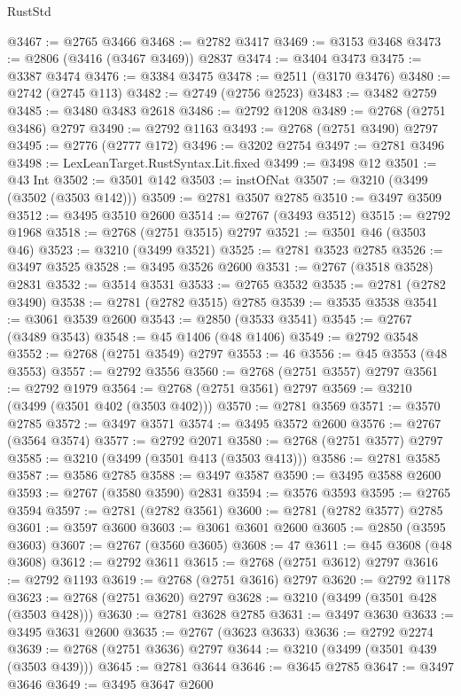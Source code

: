 \begin{lexlean}{RustStd}
\begin{coremodule}
@3467 := @2765 @3466
@3468 := @2782 @3417
@3469 := @3153 @3468
@3473 := @2806 (@3416 (@3467 @3469)) @2837
@3474 := @3404 @3473
@3475 := @3387 @3474
@3476 := @3384 @3475
@3478 := @2511 (@3170 @3476)
@3480 := @2742 (@2745 @113)
@3482 := @2749 (@2756 @2523)
@3483 := @3482 @2759
@3485 := @3480 @3483 @2618
@3486 := @2792 @1208
@3489 := @2768 (@2751 @3486) @2797
@3490 := @2792 @1163
@3493 := @2768 (@2751 @3490) @2797
@3495 := @2776 (@2777 @172)
@3496 := @3202 @2754
@3497 := @2781 @3496
@3498 := LexLeanTarget.RustSyntax.Lit.fixed
@3499 := @3498 @12
@3501 := @43 Int
@3502 := @3501 @142
@3503 := instOfNat
@3507 := @3210 (@3499 (@3502 (@3503 @142)))
@3509 := @2781 @3507 @2785
@3510 := @3497 @3509
@3512 := @3495 @3510 @2600
@3514 := @2767 (@3493 @3512)
@3515 := @2792 @1968
@3518 := @2768 (@2751 @3515) @2797
@3521 := @3501 @46 (@3503 @46)
@3523 := @3210 (@3499 @3521)
@3525 := @2781 @3523 @2785
@3526 := @3497 @3525
@3528 := @3495 @3526 @2600
@3531 := @2767 (@3518 @3528) @2831
@3532 := @3514 @3531
@3533 := @2765 @3532
@3535 := @2781 (@2782 @3490)
@3538 := @2781 (@2782 @3515) @2785
@3539 := @3535 @3538
@3541 := @3061 @3539 @2600
@3543 := @2850 (@3533 @3541)
@3545 := @2767 (@3489 @3543)
@3548 := @45 @1406 (@48 @1406)
@3549 := @2792 @3548
@3552 := @2768 (@2751 @3549) @2797
@3553 := 46
@3556 := @45 @3553 (@48 @3553)
@3557 := @2792 @3556
@3560 := @2768 (@2751 @3557) @2797
@3561 := @2792 @1979
@3564 := @2768 (@2751 @3561) @2797
@3569 := @3210 (@3499 (@3501 @402 (@3503 @402)))
@3570 := @2781 @3569
@3571 := @3570 @2785
@3572 := @3497 @3571
@3574 := @3495 @3572 @2600
@3576 := @2767 (@3564 @3574)
@3577 := @2792 @2071
@3580 := @2768 (@2751 @3577) @2797
@3585 := @3210 (@3499 (@3501 @413 (@3503 @413)))
@3586 := @2781 @3585
@3587 := @3586 @2785
@3588 := @3497 @3587
@3590 := @3495 @3588 @2600
@3593 := @2767 (@3580 @3590) @2831
@3594 := @3576 @3593
@3595 := @2765 @3594
@3597 := @2781 (@2782 @3561)
@3600 := @2781 (@2782 @3577) @2785
@3601 := @3597 @3600
@3603 := @3061 @3601 @2600
@3605 := @2850 (@3595 @3603)
@3607 := @2767 (@3560 @3605)
@3608 := 47
@3611 := @45 @3608 (@48 @3608)
@3612 := @2792 @3611
@3615 := @2768 (@2751 @3612) @2797
@3616 := @2792 @1193
@3619 := @2768 (@2751 @3616) @2797
@3620 := @2792 @1178
@3623 := @2768 (@2751 @3620) @2797
@3628 := @3210 (@3499 (@3501 @428 (@3503 @428)))
@3630 := @2781 @3628 @2785
@3631 := @3497 @3630
@3633 := @3495 @3631 @2600
@3635 := @2767 (@3623 @3633)
@3636 := @2792 @2274
@3639 := @2768 (@2751 @3636) @2797
@3644 := @3210 (@3499 (@3501 @439 (@3503 @439)))
@3645 := @2781 @3644
@3646 := @3645 @2785
@3647 := @3497 @3646
@3649 := @3495 @3647 @2600

\end{coremodule}
\end{lexlean}
